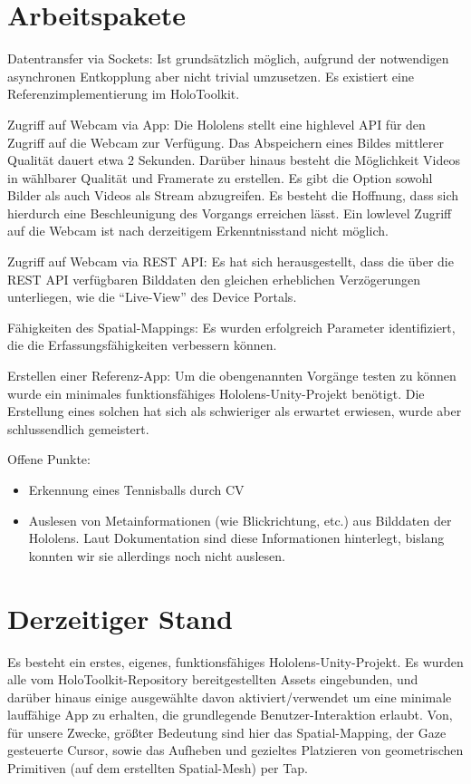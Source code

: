 \documentclass[conference, 11pt]{IEEEtran}
\begin{document}
\section{Arbeitspakete}
\begin{LaTeXdescription}
	\item[Datentransfer via Sockets:] Ist grundsätzlich möglich, aufgrund der notwendigen asynchronen Entkopplung aber nicht trivial umzusetzen. Es existiert eine Referenzimplementierung im HoloToolkit.
    \item[Zugriff auf Webcam via App:] Die Hololens stellt eine highlevel API für den Zugriff auf die Webcam zur Verfügung. Das Abspeichern eines Bildes mittlerer Qualität dauert etwa 2 Sekunden. Darüber hinaus besteht die Möglichkeit Videos in wählbarer Qualität und Framerate zu erstellen. Es gibt die Option sowohl Bilder als auch Videos als Stream abzugreifen. Es besteht die Hoffnung, dass sich hierdurch eine Beschleunigung des Vorgangs erreichen lässt. Ein lowlevel Zugriff auf die Webcam ist nach derzeitigem Erkenntnisstand nicht möglich.
    \item[Zugriff auf Webcam via REST API:] Es hat sich herausgestellt, dass die über die REST API verfügbaren Bilddaten den gleichen erheblichen Verzögerungen unterliegen, wie die \enquote{Live-View} des Device Portals.
    
    \item[Fähigkeiten des Spatial-Mappings:] Es wurden erfolgreich Parameter identifiziert, die die Erfassungsfähigkeiten verbessern können.
    \item[Erstellen einer Referenz-App:] Um die obengenannten Vorgänge testen zu können wurde ein minimales funktionsfähiges Hololens-Unity-Projekt benötigt. Die Erstellung eines solchen hat sich als schwieriger als erwartet erwiesen, wurde aber schlussendlich gemeistert.
\end{LaTeXdescription}
Offene Punkte:
\begin{itemize}
	\item Erkennung eines Tennisballs durch CV \\
    \item Auslesen von Metainformationen (wie Blickrichtung, etc.) aus Bilddaten der Hololens. Laut Dokumentation sind diese Informationen hinterlegt, bislang konnten wir sie allerdings noch nicht auslesen.
\end{itemize}


\section{Derzeitiger Stand}
Es besteht ein erstes, eigenes, funktionsfähiges Hololens-Unity-Projekt. Es wurden alle vom HoloToolkit-Repository bereitgestellten Assets eingebunden, und darüber hinaus einige ausgewählte davon aktiviert/verwendet um eine minimale lauffähige App zu erhalten, die grundlegende Benutzer-Interaktion erlaubt. Von, für unsere Zwecke, größter Bedeutung sind hier das Spatial-Mapping, der Gaze gesteuerte Cursor, sowie das Aufheben und gezieltes Platzieren von geometrischen Primitiven (auf dem erstellten Spatial-Mesh) per Tap.
\end{document}
